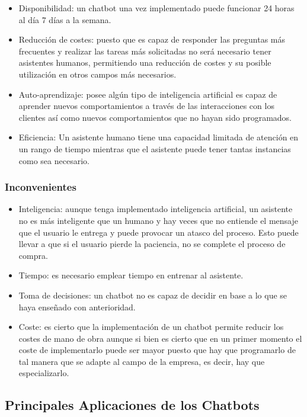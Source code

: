 \begin{itemize}
    \item Disponibilidad: un chatbot una vez implementado puede funcionar 24 horas al día 7 días a la semana.
    \item Reducción de costes: puesto que es capaz de responder las preguntas más frecuentes y realizar las tareas más solicitadas no será necesario tener asistentes humanos, permitiendo una reducción de costes y su posible utilización en otros campos más necesarios.
    \item Auto-aprendizaje: posee algún tipo de inteligencia artificial es capaz de aprender nuevos comportamientos a través de las interacciones con los clientes así como nuevos comportamientos que no hayan sido programados. 
    \item Eficiencia: Un asistente humano tiene una capacidad limitada de atención en un rango de tiempo mientras que el asistente puede tener tantas instancias como sea necesario.
\end{itemize}



\subsubsection{Inconvenientes}

\begin{itemize}
    \item Inteligencia: aunque tenga implementado inteligencia artificial, un asistente no es más inteligente que un humano y hay veces que no entiende el mensaje que el usuario le entrega y puede provocar un atasco del proceso. Esto puede llevar a que si el usuario pierde la paciencia, no se complete el proceso de compra.
    \item Tiempo: es necesario emplear tiempo en entrenar al asistente.
    \item Toma de decisiones: un chatbot no es capaz de decidir en base a lo que se haya enseñado con anterioridad.
    \item Coste: es cierto que la implementación de un chatbot permite reducir los costes de mano de obra aunque si bien es cierto que en un primer momento el coste de implementarlo puede ser mayor puesto que hay que programarlo de tal manera que se adapte al campo de la empresa, es decir, hay que especializarlo.
\end{itemize}


\subsection{Principales Aplicaciones de los Chatbots}

